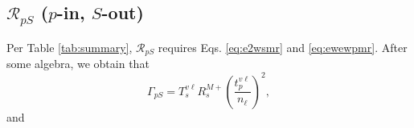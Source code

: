 \documentclass[aps,prb,10pt,showpacs,letterpaper,twocolumn]{revtex4-1}
\begin{document}

\subsection{\texorpdfstring{$\mathcal{R}_{pS}$ ($p$-in, $S$-out)} {RpS (p-in,
S-out)}}
\label{sec:RpS}

Per Table \ref{tab:summary}, $\mathcal{R}_{pS}$ requires Eqs. \eqref{eq:e2wsmr}
and \eqref{eq:ewewpmr}. After some algebra, we obtain that
\begin{equation}\label{mcv}
\Gamma_{pS} =
T_{s}^{v\ell}R^{M+}_{s}
\left(\frac{t^{v\ell}_{p}}{n_{\ell}}\right)^{2},
\end{equation}
and
\end{document}
